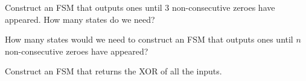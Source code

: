 \begin{blocksection}
\question
Construct an FSM that outputs ones until 3 non-consecutive zeroes have appeared. How many states do we need?

\begin{solution}[1.5in]
\end{solution}

\question
How many states would we need to construct an FSM that outputs ones until $n$ non-consecutive zeroes have appeared?

\begin{solution}[0.7in]
\end{solution}

\question
Construct an FSM that returns the XOR of all the inputs.

\begin{solution}[0.7in]
\end{solution}

\end{blocksection}